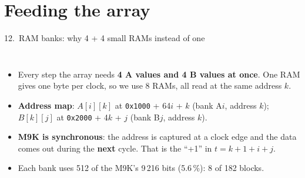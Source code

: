 \documentclass[aspectratio=169,11pt]{beamer}
\newcommand{\hx}[1]{\texttt{0x#1}}
\begin{document}
\section{Feeding the array}
\begin{frame}{12.\ RAM banks: why 4 + 4 small RAMs instead of one}
  \begin{columns}[T]
    \centering
    \small
    \begin{itemize}
      \item Every step the array needs \textbf{4 A values and 4 B values at once}. One RAM gives one byte per clock,
            so we use 8 RAMs, all read at the same address $k$.
      \item \textbf{Address map}: $A[i][k]$ at \hx{1000} + 64$i$ + $k$ (bank A$i$, address $k$);
            $B[k][j]$ at \hx{2000} + 4$k$ + $j$ (bank B$j$, address $k$).
      \item \textbf{M9K is synchronous}: the address is captured at a clock edge and the data comes out during the
            \textbf{next} cycle. That is the ``+1'' in $t = k + 1 + i + j$.
      \item Each bank uses 512 of the M9K's 9\,216 bits (5.6\,\%): 8 of 182 blocks.
    \end{itemize}
  \end{columns}
\end{frame}
\end{document}
